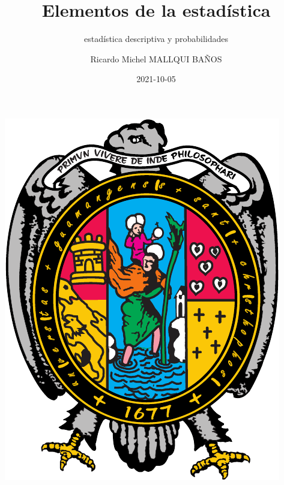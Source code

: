 \documentclass[10pt,]{krantz}
\title{Elementos de la estadística}
\subtitle{estadística descriptiva y probabilidades}
\author{Ricardo Michel MALLQUI BAÑOS}
\date{2021-10-05}
\let\oldincludegraphics\includegraphics
\renewcommand\includegraphics[2][]{%
  \oldincludegraphics[scale=0.85]{#2}
}
\theoremstyle{definition}
\theoremstyle{definition}
\theoremstyle{definition}
\theoremstyle{definition}
\theoremstyle{remark}
\begin{document}
\maketitle

\thispagestyle{empty}
\begin{center}
\includegraphics{U.pdf}
\end{center}


{
\hypersetup{linkcolor=}
\setcounter{tocdepth}{2}
\tableofcontents
}
\listoftables
\listoffigures
\newcommand{\N}{\mathbb{N}}
\newcommand{\R}{\mathbb{R}}
\newcommand{\CC}{\mathbb{C}}
\newcommand{\I}{\mathbb{I}}
\newcommand{\f}{\mathbb{f}}
\newcommand{\X}{\mathbb{X}}
\newcommand{\D}{\mathbb{D}}
\newcommand{\Z}{\mathbb{Z}}
\newcommand{\Q}{\mathbb{Q}}
\newcommand{\norm}[1]{\left\Vert#1\right\Vert}
\newcommand{\abs}[1]{\left\vert#1\right\vert}
\newcommand{\set}[1]{\left\{#1\right\}}
\newcommand{\seq}[1]{\left<#1\right>}
\newcommand{\co}[1]{\left[#1\right]}
\newcommand{\cc}[1]{\left(#1\right)}
\newcommand{\J}{\mathcal{J}}
\newcommand{\K}{\mathcal{K}}
\newcommand{\M}{\mathcal{M}}
\newcommand{\F}{\mathcal{F}}
\end{document}
